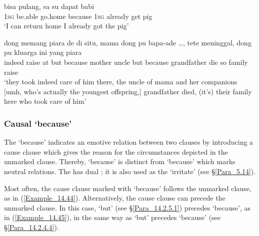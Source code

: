 \ea\label{Example_14.42}
 {bisa} {pulang,} {} {sa} {su} {dapat} {babi}\\ %
 \textsc{1sg}  be.able  go.home  because  \textsc{1sg}  already  get  pig\\
 ‘I can return home  I already got the pig’ \textstyleExampleSource{[080919-004-NP.0024]}
\z

\ea
\label{Example_14.43}
\gll       dong  memang  piara  de  di  situ,      mama  dong   pu  {bapa-ade}  {{\ldots},}     tete  meninggal,     dong  pu  kluarga  ini  yang  piara\\  
  indeed  raise    at    but because  mother       uncle  {}  but  because  grandfather  die  so       family      raise\\
\glt ‘they took indeed care of him there,  the uncle of mama and her companions [umh, who’s actually the youngest offspring,]  grandfather died,  (it’s) their family here who took care of him’ \textstyleExampleSource{[080919-006-CvNP.0006-0008]}
\z


\subsubsection[Causal gara{}-gara ‘because’]{Causal  ‘because’}
\label{Para_14.2.4.5}
The    ‘because’ indicates an emotive  relation between two clauses by introducing a cause clause which gives the reason for the circumstances depicted in the unmarked clause. Thereby,  ‘because’ is distinct from  ‘because’ which marks neutral  relations.  The  has dual ; it is also used as the    ‘irritate’ (see §\ref{Para_5.14}).

Most often, the cause clause marked with  ‘because’ follows the unmarked clause, as in (\ref{Example_14.44}). Alternatively, the cause clause can precede the unmarked clause. In this case,   ‘but’ (see §\ref{Para_14.2.5.1}) precedes  ‘because’, as in (\ref{Example_14.45}), in the same way as  ‘but’ precedes  ‘because’ (see §\ref{Para_14.2.4.4}).


